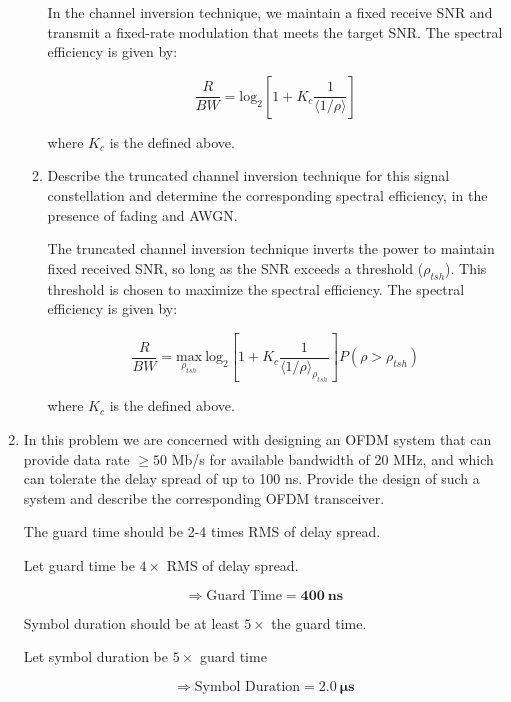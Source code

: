 \documentclass[fleqn]{article}
\begin{document}
\begin{enumerate}
\begin{enumerate}
			In the channel inversion technique, we maintain a fixed receive SNR and transmit a fixed-rate modulation that meets the target SNR. The spectral efficiency is given by:
			
			\begin{equation*}
				\frac{R}{BW} = \text{log}_2\left[1 + K_c\frac{1}{\langle1/\rho\rangle}\right]
			\end{equation*}
			
			where $K_c$ is the defined above.
			
			\item Describe the truncated channel inversion technique for this signal constellation and determine the corresponding spectral efficiency, in the presence of fading and AWGN.
			
			The truncated channel inversion technique inverts the power to maintain fixed received SNR, so long as the SNR exceeds a threshold ($\rho_{tsh}$). This threshold is chosen to maximize the spectral efficiency. The spectral efficiency is given by:
			
			\begin{equation*}
				\frac{R}{BW} = \underset{\rho_{tsh}}{\text{max}}\ \text{log}_2\left[1 + K_c\frac{1}{\langle1/\rho\rangle_{\rho_{tsh}}}\right]P(\rho > \rho_{tsh})
			\end{equation*}
			
			where $K_c$ is the defined above.
			
		\end{enumerate}
		
		\item In this problem we are concerned with designing an OFDM system that can provide data rate $\geq 50$ Mb/s for available bandwidth of 20 MHz, and which can tolerate the delay spread of up to 100 ns. Provide the design of such a system and describe the corresponding OFDM transceiver.
		
		The guard time should be 2-4 times RMS of delay spread.
		
		Let guard time be $4\times$ RMS of delay spread.
		
		\begin{equation*}
			\Rightarrow \text{Guard Time} = \mathbf{400\ ns}
		\end{equation*}
		
		Symbol duration should be at least $5\times$ the guard time. 
		
		Let symbol duration be $5\times$ guard time
		
		\begin{equation*}
			\Rightarrow \text{Symbol Duration} = \mathbf{2.0\ \mu{s}}
		\end{equation*}
		

\end{enumerate}
\end{document}

